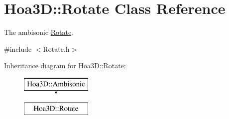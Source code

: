 \hypertarget{class_hoa3_d_1_1_rotate}{\section{Hoa3\-D\-:\-:Rotate Class Reference}
\label{class_hoa3_d_1_1_rotate}
}


The ambisonic \hyperlink{class_hoa3_d_1_1_rotate}{Rotate}.  




{\ttfamily \#include $<$Rotate.\-h$>$}

Inheritance diagram for Hoa3\-D\-:\-:Rotate\-:\begin{figure}[H]
\begin{center}
\leavevmode
\includegraphics[height=2.000000cm]{class_hoa3_d_1_1_rotate}
\end{center}
\end{figure}
